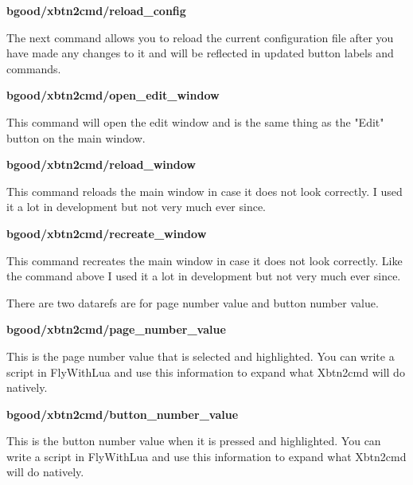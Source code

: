 \documentclass[11pt,parskip=half,a4paper]{scrartcl}
\begin{document}
{\bfseries bgood/xbtn2cmd/reload\_config}

The next command allows you to reload the current configuration file after you have made any changes to it and will be reflected in updated button labels and commands.


{\bfseries bgood/xbtn2cmd/open\_edit\_window}

This command will open the edit window and is the same thing as the "Edit" button on the main window.


{\bfseries bgood/xbtn2cmd/reload\_window}

This command reloads the main window in case it does not look correctly. I used it a lot in development but not very much ever since.


{\bfseries bgood/xbtn2cmd/recreate\_window}

This command recreates the main window in case it does not look correctly. Like the command above I used it a lot in development but not very much ever since. \newline \newline 


There are two datarefs are for page number value and button number value.

{\bfseries bgood/xbtn2cmd/page\_number\_value}

This is the page number value that is selected and highlighted. You can write a script in FlyWithLua and use this information to expand what Xbtn2cmd will do natively. 


{\bfseries bgood/xbtn2cmd/button\_number\_value}

This is the button number value when it is pressed and highlighted. You can write a script in FlyWithLua and use this information to expand what Xbtn2cmd will do natively.
\end{document}
